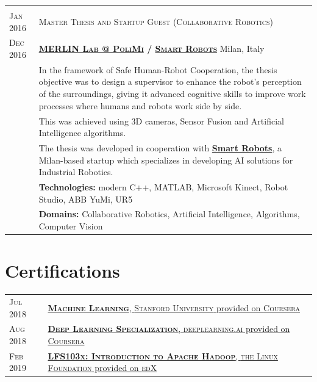 \documentclass[a4paper,10pt]{article}
\begin{document}
\begin{tabular}{p{1.7cm}|p{15.5cm}}
      \multicolumn{2}{c}{} \\
      \centering\textsc{Jan 2016 } & 
      \textsc{Master Thesis and Startup Guest (Collaborative Robotics)} \\
      \centering\textsc{Dec 2016} &
      \textsc{\textbf{\href{http://merlin.dei.polimi.it/}{MERLIN Lab @ PoliMi} / \href{http://smartrobots.it/en/}{Smart Robots}}} \hfill Milan, Italy\\
      & In the framework of Safe Human-Robot Cooperation, the thesis objective was to design a supervisor to enhance the robot's perception of the surroundings, giving it advanced cognitive skills to improve work processes where humans and robots work side by side.\\
      & This was achieved using 3D cameras, Sensor Fusion and Artificial Intelligence algorithms.\\
      & The thesis was developed in cooperation with \textbf{\href{http://smartrobots.it/en/}{Smart Robots}}, a Milan-based startup which specializes in developing AI solutions for Industrial Robotics.\\
      & \textbf{Technologies:}  modern C++, MATLAB, Microsoft Kinect, Robot Studio, ABB YuMi, UR5\\
      & \textbf{Domains:} Collaborative Robotics, Artificial Intelligence, Algorithms, Computer Vision\\
   \end{tabular}

   \section{Certifications}
   \begin{tabular}{p{1.7cm}|p{15.5cm}}
      \centering\textsc{Jul 2018} &
      \href{https://www.coursera.org/account/accomplishments/certificate/PHU5XX9EQ5LP}{\textbf{\textsc{Machine Learning}}, \textsc{Stanford University} provided on \textsc{Coursera}} \\
      
      \centering\textsc{Aug 2018} &
      \href{https://www.coursera.org/account/accomplishments/specialization/certificate/MQRAWL6XD2QW}{\textbf{\textsc{Deep Learning Specialization}}, \textsc{deeplearning.ai} provided on \textsc{Coursera}} \\
      
      \centering\textsc{Feb 2019} &
      \href{https://courses.edx.org/certificates/62fb5163c20048faa605408b3f931718}{\textbf{\textsc{LFS103x: Introduction to Apache Hadoop}}, \textsc{the Linux Foundation} provided on \textsc{edX}} \\

   \end{tabular}
\end{document}
